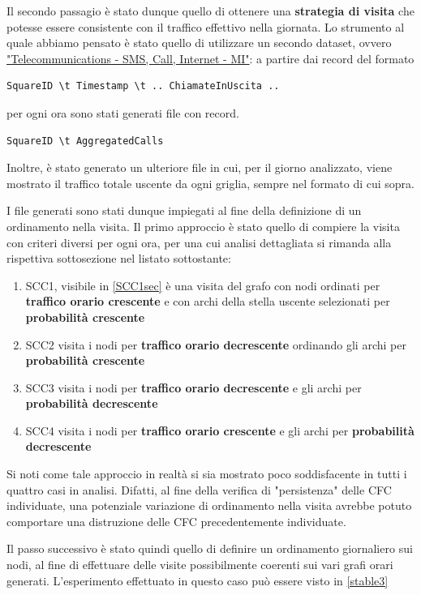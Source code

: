 \documentclass[10pt,a4paper]{article}
\begin{document}
Il secondo passagio è stato dunque quello di ottenere una \textbf{strategia di visita} che potesse essere consistente con il traffico effettivo nella giornata.
Lo strumento al quale abbiamo pensato è stato quello di utilizzare un secondo dataset, ovvero \href{https://dandelion.eu/datagem/telecom-sms-call-internet-mi/description/}{"Telecommunications - SMS, Call, Internet - MI"}:
a partire dai record del formato
\begin{verbatim}
SquareID \t Timestamp \t .. ChiamateInUscita ..
\end{verbatim}
per ogni ora sono stati generati file con record.
\begin{verbatim}
SquareID \t AggregatedCalls
\end{verbatim}
Inoltre, è stato generato un ulteriore file in cui, per il giorno analizzato, viene mostrato il traffico totale uscente da ogni griglia, sempre nel formato di cui sopra.

I file generati sono stati dunque impiegati al fine della definizione di un ordinamento nella visita.
Il primo approccio è stato quello di compiere la visita con criteri diversi per ogni ora, per una cui analisi dettagliata si rimanda alla rispettiva sottosezione nel listato sottostante:
\begin{enumerate}
\item SCC1, visibile in \ref{SCC1sec} è una visita del grafo con nodi ordinati per \textbf{traffico orario crescente} e con archi della stella uscente selezionati per \textbf{probabilità crescente} 
\item SCC2 visita i nodi per \textbf{traffico orario decrescente} ordinando gli archi per \textbf{probabilità crescente}
\item SCC3 visita i nodi per \textbf{traffico orario decrescente} e gli archi per \textbf{probabilità decrescente}
\item SCC4 visita i nodi per \textbf{traffico orario crescente} e gli archi per \textbf{probabilità decrescente}
\end{enumerate}
Si noti come tale approccio in realtà si sia mostrato poco soddisfacente in tutti i quattro casi in analisi. Difatti, al fine della verifica di "persistenza" delle CFC individuate, una potenziale variazione di ordinamento nella visita avrebbe potuto comportare una distruzione delle CFC precedentemente individuate.

Il passo successivo è stato quindi quello di definire un ordinamento giornaliero sui nodi, al fine di effettuare delle visite possibilmente coerenti sui vari grafi orari generati. L'esperimento effettuato in questo caso può essere visto in \ref{stable3}
\end{document}
